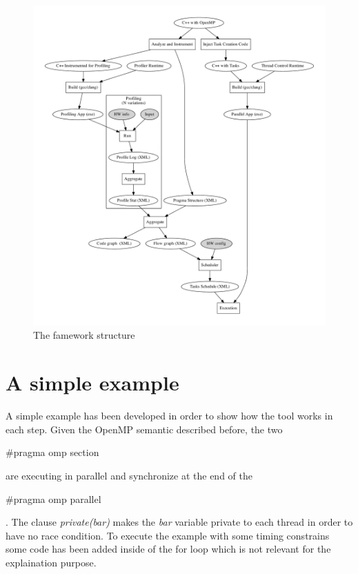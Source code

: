 \documentclass[a4paper,12pt,oneside]{book}
\begin{document}
\begin{figure}[H]
\centering
\includegraphics[scale=0.5]{tgraph.pdf}
\caption{The famework structure}
\label{framework}
\end{figure}


\section{A simple example}
\label{example}
A simple example has been developed in order to show how the tool works in each step. Given the OpenMP semantic described before, the two \begin{bf}$\#$pragma omp section\end{bf} are executing in parallel and synchronize at the end of the \begin{bf}$\#$pragma omp parallel\end{bf}. The clause \emph{private(bar)} makes the \emph{bar} variable private to each thread in order to have no race condition. To execute the example with some timing constrains some code has been added inside of the for loop which is not relevant for the explaination purpose.
\end{document}
